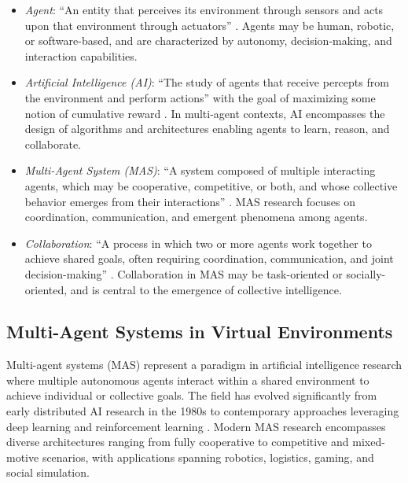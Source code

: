 \documentclass[a4paper, 12pt]{article}
\begin{document}
\begin{itemize}
    \item \textit{Agent}: ``An entity that perceives its environment through sensors and acts upon that environment through actuators'' \autocite{Russell2009ArtificialIntelligenceAModernApproach}. Agents may be human, robotic, or software-based, and are characterized by autonomy, decision-making, and interaction capabilities.
    \item \textit{Artificial Intelligence (AI)}: ``The study of agents that receive percepts from the environment and perform actions'' with the goal of maximizing some notion of cumulative reward \autocite{Russell2009ArtificialIntelligenceAModernApproach}. In multi-agent contexts, AI encompasses the design of algorithms and architectures enabling agents to learn, reason, and collaborate.
    \item \textit{Multi-Agent System (MAS)}: ``A system composed of multiple interacting agents, which may be cooperative, competitive, or both, and whose collective behavior emerges from their interactions'' \autocite{Wooldridge2009AnIntroductionToMultiAgentSystems}. MAS research focuses on coordination, communication, and emergent phenomena among agents.
    \item \textit{Collaboration}: ``A process in which two or more agents work together to achieve shared goals, often requiring coordination, communication, and joint decision-making'' \autocite{Panait2005CooperativeMultiAgentLearning}. Collaboration in MAS may be task-oriented or socially-oriented, and is central to the emergence of collective intelligence.
\end{itemize}

\subsection{Multi-Agent Systems in Virtual Environments}

Multi-agent systems (MAS) represent a paradigm in artificial intelligence research where multiple autonomous agents interact within a shared environment to achieve individual or collective goals. The field has evolved significantly from early distributed AI research in the 1980s to contemporary approaches leveraging deep learning and reinforcement learning \autocite{Leeuwen2021SelfOrganizingMS, shu2024effectivegenaimultiagentcollaboration}. Modern MAS research encompasses diverse architectures ranging from fully cooperative to competitive and mixed-motive scenarios, with applications spanning robotics, logistics, gaming, and social simulation.
\end{document}
